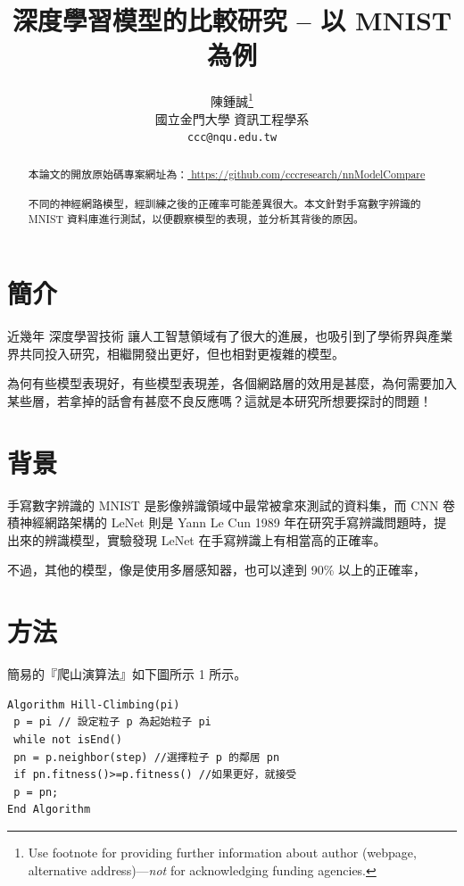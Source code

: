 \documentclass{article}
\title{深度學習模型的比較研究 -- 以 MNIST 為例}
\author{
  陳鍾誠\thanks{Use footnote for providing further
    information about author (webpage, alternative
    address)---\emph{not} for acknowledging funding agencies.} \\
  國立金門大學 資訊工程學系\\
  \texttt{ccc@nqu.edu.tw} \\
}
\begin{document}
\maketitle

\begin{abstract}
本論文的開放原始碼專案網址為：\url{ https://github.com/cccresearch/nnModelCompare }
\\
\\
不同的神經網路模型，經訓練之後的正確率可能差異很大。本文針對手寫數字辨識的MNIST 資料庫進行測試，以便觀察模型的表現，並分析其背後的原因。
\end{abstract}




\section{簡介}

近幾年 深度學習技術 讓人工智慧領域有了很大的進展，也吸引到了學術界與產業界共同投入研究，相繼開發出更好，但也相對更複雜的模型。

為何有些模型表現好，有些模型表現差，各個網路層的效用是甚麼，為何需要加入某些層，若拿掉的話會有甚麼不良反應嗎？這就是本研究所想要探討的問題！

\section{背景}
\label{background}

手寫數字辨識的 MNIST 是影像辨識領域中最常被拿來測試的資料集，而 CNN 卷積神經網路架構的 LeNet 則是 Yann Le Cun 1989 年在研究手寫辨識問題時，提出來的辨識模型，實驗發現 LeNet 在手寫辨識上有相當高的正確率。

不過，其他的模型，像是使用多層感知器，也可以達到 90\% 以上的正確率，


\section{方法}

簡易的『爬山演算法』如下圖所示
1 所示。

\begin{verbatim}
Algorithm Hill-Climbing(pi)
 p = pi // 設定粒子 p 為起始粒子 pi
 while not isEnd()
 pn = p.neighbor(step) //選擇粒子 p 的鄰居 pn
 if pn.fitness()>=p.fitness() //如果更好，就接受
 p = pn;
End Algorithm
\end{verbatim}
\end{document}
